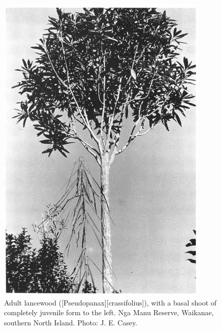 \begin{figure}[htb]
	\centering
	\begin{minipage}[t]{0.482\textwidth}
		\centering
		\includegraphics[width=0.9\textwidth]{graphics/figure20lancewood.jpg}
    	\caption[Adult lancewood]{Adult lancewood ([Pseudopanax][crassifolius]), with a basal shoot of completely juvenile form to the left.
        Nga Manu Reserve, Waikanae, southern North Island.
    	Photo: J. E. Casey.}%
    	\label{fig:20lancewood}
	\end{minipage}\hfill%
	\begin{minipage}[t]{0.498\textwidth}
    	\centering

\end{minipage}
\end{figure}
